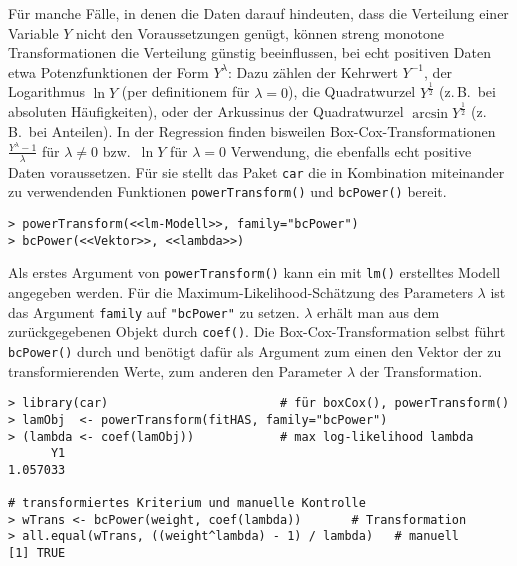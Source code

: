 Für manche Fälle, in denen die Daten darauf hindeuten, dass die Verteilung einer Variable $Y$ nicht den Voraussetzungen genügt, können streng monotone Transformationen die Verteilung günstig beeinflussen, bei echt positiven Daten etwa Potenzfunktionen der Form $Y^{\lambda}$: Dazu zählen der Kehrwert $Y^{-1}$, der Logarithmus $\ln Y$ (per definitionem für $\lambda = 0$), die Quadratwurzel $Y^{\frac{1}{2}}$ (z.\,B.\ bei absoluten Häufigkeiten), oder der Arkussinus der Quadratwurzel $\arcsin Y^{\frac{1}{2}}$ (z.\,B.\ bei Anteilen). In der Regression finden bisweilen Box-Cox-Transformationen $\frac{Y^{\lambda}-1}{\lambda}$ für $\lambda \neq 0$ bzw.\ $\ln Y$ für $\lambda = 0$ Verwendung, die ebenfalls echt positive Daten voraussetzen. Für sie stellt das Paket \lstinline!car! die in Kombination miteinander zu verwendenden Funktionen  \lstinline!powerTransform()! und \lstinline!bcPower()! bereit.
\begin{lstlisting}
> powerTransform(<<lm-Modell>>, family="bcPower")
> bcPower(<<Vektor>>, <<lambda>>)
\end{lstlisting}

Als erstes Argument von \lstinline!powerTransform()! kann ein mit \lstinline!lm()! erstelltes Modell angegeben werden. Für die Maximum-Likelihood-Schätzung des Parameters $\lambda$ ist das Argument \lstinline!family! auf \lstinline!"bcPower"! zu setzen. $\lambda$ erhält man aus dem zurückgegebenen Objekt durch \lstinline!coef()!. Die Box-Cox-Transformation selbst führt \lstinline!bcPower()! durch und benötigt dafür als Argument zum einen den Vektor der zu transformierenden Werte, zum anderen den Parameter $\lambda$ der Transformation.
\begin{lstlisting}
> library(car)                        # für boxCox(), powerTransform()
> lamObj  <- powerTransform(fitHAS, family="bcPower")
> (lambda <- coef(lamObj))            # max log-likelihood lambda
      Y1
1.057033

# transformiertes Kriterium und manuelle Kontrolle
> wTrans <- bcPower(weight, coef(lambda))       # Transformation
> all.equal(wTrans, ((weight^lambda) - 1) / lambda)   # manuell
[1] TRUE
\end{lstlisting}

